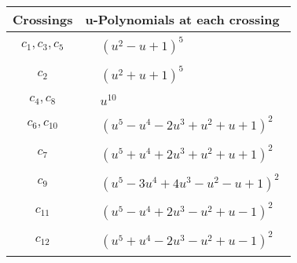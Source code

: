 \documentclass[1p]{elsarticle_modified}
\theoremstyle{definition}
\begin{document}
\begin{tabular}{m{50pt}|m{274pt}}
Crossings & \hspace{64pt}u-Polynomials at each crossing \\
\hline $$\begin{aligned}c_{1},c_{3},c_{5}\end{aligned}$$&$\begin{aligned}
&(u^2- u+1)^5
\end{aligned}$\\
\hline $$\begin{aligned}c_{2}\end{aligned}$$&$\begin{aligned}
&(u^2+u+1)^5
\end{aligned}$\\
\hline $$\begin{aligned}c_{4},c_{8}\end{aligned}$$&$\begin{aligned}
&u^{10}
\end{aligned}$\\
\hline $$\begin{aligned}c_{6},c_{10}\end{aligned}$$&$\begin{aligned}
&(u^5- u^4-2 u^3+u^2+u+1)^2
\end{aligned}$\\
\hline $$\begin{aligned}c_{7}\end{aligned}$$&$\begin{aligned}
&(u^5+u^4+2 u^3+u^2+u+1)^2
\end{aligned}$\\
\hline $$\begin{aligned}c_{9}\end{aligned}$$&$\begin{aligned}
&(u^5-3 u^4+4 u^3- u^2- u+1)^2
\end{aligned}$\\
\hline $$\begin{aligned}c_{11}\end{aligned}$$&$\begin{aligned}
&(u^5- u^4+2 u^3- u^2+u-1)^2
\end{aligned}$\\
\hline $$\begin{aligned}c_{12}\end{aligned}$$&$\begin{aligned}
&(u^5+u^4-2 u^3- u^2+u-1)^2
\end{aligned}$\\
\hline
\end{tabular}\\~\\
\end{document}
